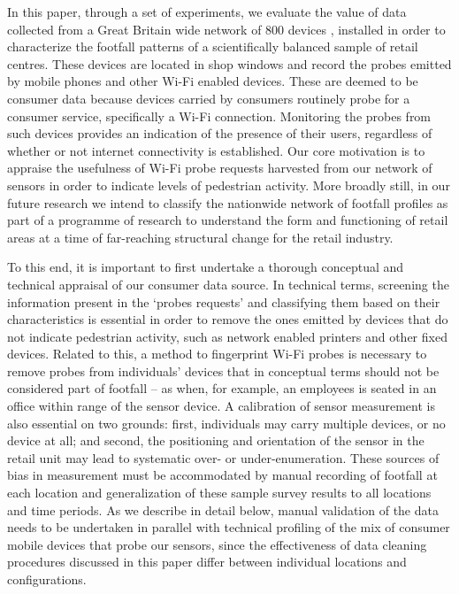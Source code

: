 In this paper, through a set of experiments, we evaluate the value of data collected from a Great Britain wide network of 800 devices \citep{sss2016}, installed in order to characterize the footfall patterns of a scientifically balanced sample of retail centres.
These devices are located in shop windows and record the probes emitted by mobile phones and other Wi-Fi enabled devices.
These are deemed to be consumer data because devices carried by consumers routinely probe for a consumer service, specifically a Wi-Fi connection.
Monitoring the probes from such devices provides an indication of the presence of their users, regardless of whether or not internet connectivity is established.
Our core motivation is to appraise the usefulness of Wi-Fi probe requests harvested from our network of sensors in order to indicate levels of pedestrian activity.
More broadly still, in our future research we intend to classify the nationwide network of footfall profiles as part of a programme of research to understand the form and functioning of retail areas at a time of far-reaching structural change for the retail industry.

To this end, it is important to first undertake a thorough conceptual and technical appraisal of our consumer data source.
In technical terms, screening the information present in the `probes requests' and classifying them based on their characteristics is essential in order to remove the ones emitted by devices that do not indicate pedestrian activity, such as network enabled printers and other fixed devices.
Related to this, a method to fingerprint Wi-Fi probes is necessary to remove probes from individuals’ devices that in conceptual terms should not be considered part of footfall – as when, for example, an employees is seated in an office within range of the sensor device.
A calibration of sensor measurement is also essential on two grounds: first, individuals may carry multiple devices, or no device at all; and second, the positioning and orientation of the sensor in the retail unit may lead to systematic over- or under-enumeration.
These sources of bias in measurement must be accommodated by manual recording of footfall at each location and generalization of these sample survey results to all locations and time periods.
As we describe in detail below, manual validation of the data needs to be undertaken in parallel with technical profiling of the mix of consumer mobile devices that probe our sensors, since the effectiveness of data cleaning procedures discussed in this paper differ between individual locations and configurations.
